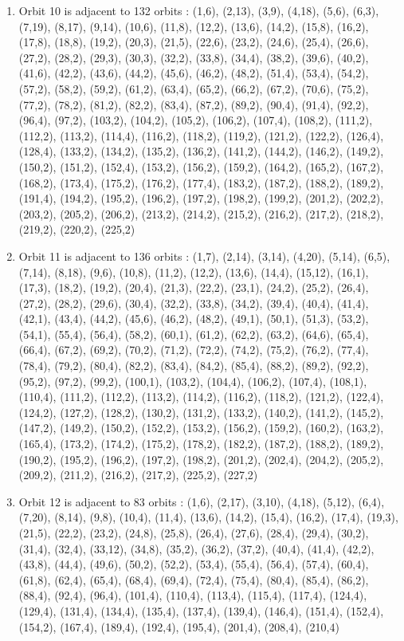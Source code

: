 \documentclass[12pt]{article}
\begin{document}
\begin{enumerate}
\item Orbit 10 is adjacent to 132 orbits : (1,6), (2,13), (3,9), (4,18), (5,6), (6,3), (7,19), (8,17), (9,14), (10,6), (11,8), (12,2), (13,6), (14,2), (15,8), (16,2), (17,8), (18,8), (19,2), (20,3), (21,5), (22,6), (23,2), (24,6), (25,4), (26,6), (27,2), (28,2), (29,3), (30,3), (32,2), (33,8), (34,4), (38,2), (39,6), (40,2), (41,6), (42,2), (43,6), (44,2), (45,6), (46,2), (48,2), (51,4), (53,4), (54,2), (57,2), (58,2), (59,2), (61,2), (63,4), (65,2), (66,2), (67,2), (70,6), (75,2), (77,2), (78,2), (81,2), (82,2), (83,4), (87,2), (89,2), (90,4), (91,4), (92,2), (96,4), (97,2), (103,2), (104,2), (105,2), (106,2), (107,4), (108,2), (111,2), (112,2), (113,2), (114,4), (116,2), (118,2), (119,2), (121,2), (122,2), (126,4), (128,4), (133,2), (134,2), (135,2), (136,2), (141,2), (144,2), (146,2), (149,2), (150,2), (151,2), (152,4), (153,2), (156,2), (159,2), (164,2), (165,2), (167,2), (168,2), (173,4), (175,2), (176,2), (177,4), (183,2), (187,2), (188,2), (189,2), (191,4), (194,2), (195,2), (196,2), (197,2), (198,2), (199,2), (201,2), (202,2), (203,2), (205,2), (206,2), (213,2), (214,2), (215,2), (216,2), (217,2), (218,2), (219,2), (220,2), (225,2)
\item Orbit 11 is adjacent to 136 orbits : (1,7), (2,14), (3,14), (4,20), (5,14), (6,5), (7,14), (8,18), (9,6), (10,8), (11,2), (12,2), (13,6), (14,4), (15,12), (16,1), (17,3), (18,2), (19,2), (20,4), (21,3), (22,2), (23,1), (24,2), (25,2), (26,4), (27,2), (28,2), (29,6), (30,4), (32,2), (33,8), (34,2), (39,4), (40,4), (41,4), (42,1), (43,4), (44,2), (45,6), (46,2), (48,2), (49,1), (50,1), (51,3), (53,2), (54,1), (55,4), (56,4), (58,2), (60,1), (61,2), (62,2), (63,2), (64,6), (65,4), (66,4), (67,2), (69,2), (70,2), (71,2), (72,2), (74,2), (75,2), (76,2), (77,4), (78,4), (79,2), (80,4), (82,2), (83,4), (84,2), (85,4), (88,2), (89,2), (92,2), (95,2), (97,2), (99,2), (100,1), (103,2), (104,4), (106,2), (107,4), (108,1), (110,4), (111,2), (112,2), (113,2), (114,2), (116,2), (118,2), (121,2), (122,4), (124,2), (127,2), (128,2), (130,2), (131,2), (133,2), (140,2), (141,2), (145,2), (147,2), (149,2), (150,2), (152,2), (153,2), (156,2), (159,2), (160,2), (163,2), (165,4), (173,2), (174,2), (175,2), (178,2), (182,2), (187,2), (188,2), (189,2), (190,2), (195,2), (196,2), (197,2), (198,2), (201,2), (202,4), (204,2), (205,2), (209,2), (211,2), (216,2), (217,2), (225,2), (227,2)
\item Orbit 12 is adjacent to 83 orbits : (1,6), (2,17), (3,10), (4,18), (5,12), (6,4), (7,20), (8,14), (9,8), (10,4), (11,4), (13,6), (14,2), (15,4), (16,2), (17,4), (19,3), (21,5), (22,2), (23,2), (24,8), (25,8), (26,4), (27,6), (28,4), (29,4), (30,2), (31,4), (32,4), (33,12), (34,8), (35,2), (36,2), (37,2), (40,4), (41,4), (42,2), (43,8), (44,4), (49,6), (50,2), (52,2), (53,4), (55,4), (56,4), (57,4), (60,4), (61,8), (62,4), (65,4), (68,4), (69,4), (72,4), (75,4), (80,4), (85,4), (86,2), (88,4), (92,4), (96,4), (101,4), (110,4), (113,4), (115,4), (117,4), (124,4), (129,4), (131,4), (134,4), (135,4), (137,4), (139,4), (146,4), (151,4), (152,4), (154,2), (167,4), (189,4), (192,4), (195,4), (201,4), (208,4), (210,4)

\end{enumerate}
\end{document}
